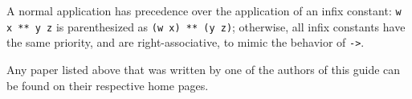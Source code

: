 \documentclass{article}
\begin{document}
A normal application has precedence over the application of an infix
constant: {\tt w x ** y z} is parenthesized as {\tt (w x) ** (y z)};
otherwise, all infix constants have the same priority, and are
right-associative, to mimic the behavior of {\tt ->}.





\noindent Any paper listed above that was written by one of the
authors of this guide can be found on their respective home pages.
\end{document}
